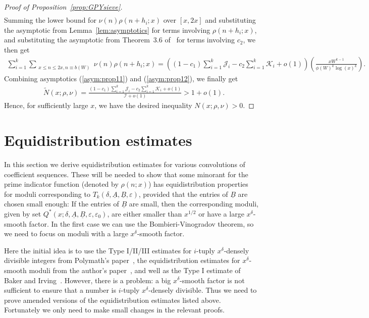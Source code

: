 \documentclass{amsart}
\numberwithin{equation}{section}
\begin{document}
\begin{proof}[Proof of Proposition~\ref{prop:GPYsieve}]
\begin{align*}
\end{align*}
Summing the lower bound for $\nu(n) \rho(n+h_i;x)$ over $[x,2x]$ and substituting the asymptotic from Lemma~\ref{lem:asymptotics} for terms involving $\rho(n+h_i;x)$, and substituting the asymptotic from Theorem~3.6 of~\cite{Polymath:2014:VSS} for terms involving $c_2$, we then get 
\begin{align} \label{asym:prop12}
\sum_{i=1}^k\sum_{\substack{x \leq n \leq 2x,  n \equiv b(W) }} \nu(n)   \rho(n+h_i;x)  =  \left((1-c_1) \sum_{i=1}^k  \mathcal{J}_i - c_2 \sum_{i=1}^k  \mathcal{K}_i + o(1) \right) \left( \frac{ xW^{k-1}}{\phi(W)^{k} \log(x)^{k}}\right).
\end{align}
Combining asymptotics (\ref{asym:prop11}) and (\ref{asym:prop12}), we finally get 
\begin{align*}
&\widetilde{N}(x;\rho,\nu)=  \frac{(1-c_1) \sum_{i=1}^k  \mathcal{J}_i - c_2 \sum_{i=1}^k  \mathcal{K}_i + o(1) }{ \mathcal{I} + o(1)  } > 1+o(1).
\end{align*} 
Hence, for sufficiently large $x$, we have the desired inequality $N(x;\rho,\nu)>0$.
\end{proof}


\section{Equidistribution estimates} \label{sec:equiest}

In this section we derive equidistribution estimates for various convolutions of coefficient sequences. These will be needed to show that some minorant for the prime indicator function (denoted by $\rho(n;x)$)  has equidistribution properties for  moduli corresponding to $T_k(\delta,\underline{A},\underline{B},\varepsilon)$, provided that the entries of $\underline{B}$ are chosen small enough:  If the entries of $\underline{B}$ are small, then the corresponding moduli, given by set $Q^*(x;\delta,\underline{A},\underline{B},\varepsilon,\varepsilon_0)$, are either smaller than $x^{1/2}$ or have a large $x^\delta$-smooth factor.  In the first case we can use the Bombieri-Vinogradov theorem, so we need to focus on moduli with a large $x^\delta$-smooth factor.


\medskip  Here the initial idea is to use the Type I/II/III estimates for $i$-tuply $x^\delta$-densely divisible integers from Polymath's paper~\cite{Polymath:2014:EDZ},  the equidistribution estimates for $x^\delta$-smooth moduli from the author's paper~\cite{Stadlmann:2023:PAP}, and well as the Type I estimate of Baker and Irving~\cite{Baker:2017:BIP}. However, there is a problem:   a big $x^\delta$-smooth factor is  not sufficient to ensure that a number is $i$-tuply $x^\delta$-densely divisible. Thus we need to prove amended versions of the equidistribution estimates listed above. Fortunately we only need to make small changes in the relevant proofs.
\end{document}
